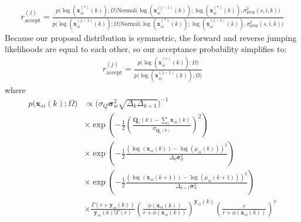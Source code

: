 \documentclass{article}
\newcommand{\Normaldist}{\text{Normal}}
\newcommand{\pv}{\mathbf{\sigma}_w^2}
\newcommand{\musik}[3]{\mu_{#1 #2}(#3)}
\newcommand{\xsik}[3]{\mathbf{x}_{#1 #2}(#3)}
\newcommand{\xsikexp}[4]{\mathbf{x}^{#4}_{#1 #2}(#3)}
\newcommand{\countsik}[3]{\mathbf{y}_{#1 #2}(#3)}
\newcommand{\qpcrsk}[2]{\mathbf{Q}_{#1}(#2)}
\newcommand{\varpropsik}[3]{\sigma^2_{\text{prop}}(#1, #2, #3)}
\newcommand{\dt}{\Delta_k}
\newcommand{\dtk}[1]{\Delta_{#1}} %
\begin{document}
\begin{align}
    r_{\text{accept}}^{(j)} = \frac
        {
            p \Big( \log \left( \xsikexp{s}{i}{k}{(*)} \right) ; \Omega \Big)
            \Normaldist \Big( 
                \log \left( \xsikexp{s}{i}{k}{(j-1)} \right) ;
                \log \left( \xsikexp{s}{i}{k}{(*)} \right), 
                \varpropsik{s}{i}{k} \Big)}
        {
            p \Big( \log \left( \xsikexp{s}{i}{k}{(j-1)} \right) ; \Omega \Big)
            \Normaldist \Big( 
                \log \left( \xsikexp{s}{i}{k}{(*)} \right) ;
                \log \left(\xsikexp{s}{i}{k}{(j-1)} \right), 
                \varpropsik{s}{i}{k} \Big)}
\end{align}
Because our proposal distribution is symmetric, the forward and reverse jumping likelihoods are equal to each other, so our acceptance probability simplifies to:
\begin{align}
    r_{\text{accept}}^{(j)} = \frac
        {p \Big( \log \left( \xsikexp{s}{i}{k}{(*)} \right) ;
        \Omega \Big)}
        {p \Big( \log \left( \xsikexp{s}{i}{k}{(j-1)} \right) ; \Omega \Big)}
\end{align}
where
\begin{align}
    p \Big(  \xsik{s}{i}{k} ; \Omega \Big) & \propto 
        \Big( \sigma_Q \pv \sqrt{\dtk{k} \dtk{k+1}} \Big)^{-1} \\
        & \times \exp \left(
            -\frac{1}{2} 
            \left(\frac
                {\qpcrsk{s}{k} - \sum_i \xsik{s}{i}{k}}
                {\sigma_{\qpcrsk{s}{k}}} \right)^2 \right) \nonumber \\ 
        & \times \exp \left(
            -\frac{1}{2} 
            \frac
                {\left(
                    \log \left(\xsik{s}{i}{k} \right) - 
                    \log \left(\musik{s}{i}{k} \right) \right)^2 }
                { \dt \pv} \right) \nonumber \\ 
        & \times \exp \left(
            -\frac{1}{2} 
            \frac
                {\left(
                   \log \left( \xsik{s}{i}{k+1} \right) - 
                   \log \left( \musik{s}{i}{k+1} \right) 
                \right)^2 }
                { \dtk{k+1} \pv} \right) \nonumber \\
        & \times \frac
            {\Gamma (r + \countsik{s}{i}{k})}
            {\countsik{s}{i}{k} ! \Gamma (r)}
            \left(
                \frac
                    {\phi (\xsik{s}{i}{k})}
                    {r + \phi(\xsik{s}{i}{k})}
            \right)^{\countsik{s}{i}{k}}
            \left(
                \frac{r}{r + \phi(\xsik{s}{i}{k})}
            \right)^r \nonumber
\end{align}
\end{document}
